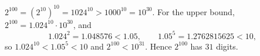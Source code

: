 $2^{100}=\left(2^{10}\right)^{10}=1024^{10}>1000^{10}=10^{30}$. For the upper bound, $2^{100}=1.024^{10}\cdot10^{30}$, and
\[1.024^2=1.048576<1.05,\qquad1.05^5=1.2762815625<10,\]
so $1.024^{10}<1.05^5<10$ and $2^{100}<10^{31}$. Hence $2^{100}$ has $\boxed{31}$ digits.

